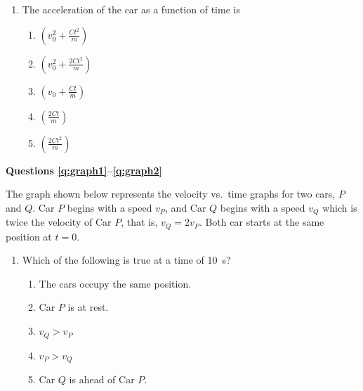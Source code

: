 \documentclass{../../../oss-classkick}
\begin{document}
\begin{multicols*}{2}
\begin{enumerate}[resume,leftmargin=18pt]
  \item The acceleration of the car as a function of time is
    \begin{enumerate}[nosep,leftmargin=18pt,label=(\Alph*)]
    \item $\displaystyle\left(v_0^2+\frac{Ct^2}{m}\right)$
    \item $\displaystyle\left(v_0^2+\frac{2Ct^2}{m}\right)$
    \item $\displaystyle\left(v_0+\frac{Ct}{m}\right)$
    \item $\displaystyle\left(\frac{2Ct}{m}\right)$
    \item $\displaystyle\left(\frac{2Ct^2}{m}\right)$
    \end{enumerate}
    \label{car2}
  \end{enumerate}
  \columnbreak
  
  \textbf{Questions \ref{q:graph1}--\ref{q:graph2}}

  The graph shown below represents the velocity vs.\ time graphs for two cars,
  $P$ and $Q$. Car $P$ begins with a speed $v_P$, and Car $Q$ begins with a
  speed $v_Q$ which is twice the velocity of Car $P$, that is, $v_Q=2v_P$. Both
  car starts at the same position at $t=0$.
  \begin{center}
  \end{center}
  \begin{enumerate}[resume,leftmargin=18pt]
  \item Which of the following is true at a time of \SI{10}{\second}?
    \begin{enumerate}[nosep,leftmargin=18pt,label=(\Alph*)]
    \item The cars occupy the same position.
    \item Car $P$ is at rest.
    \item $v_Q>v_P$
    \item $v_P>v_Q$
    \item Car $Q$ is ahead of Car $P$.
    \end{enumerate}
    \label{q:graph1}
    \vspace{.7in}
    

\end{enumerate}
\end{multicols*}
\end{document}
